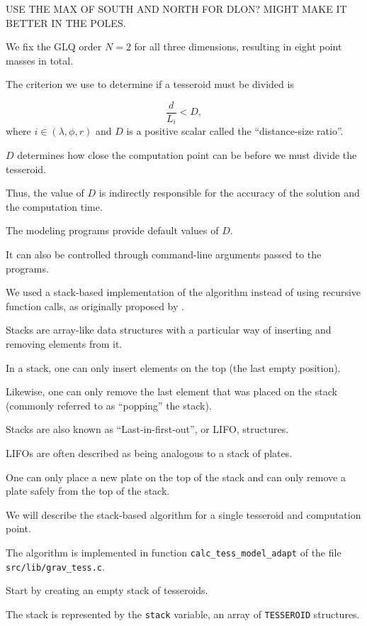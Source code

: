 \documentclass[manuscript]{geophysics}
\begin{document}
USE THE MAX OF SOUTH AND NORTH FOR DLON? MIGHT MAKE IT BETTER IN THE POLES.

We fix the GLQ order $N=2$ for all three dimensions, resulting in eight point
masses in total.

The criterion we use to determine if a tesseroid must be divided is

\begin{equation}
    \frac{d}{L_i} < D,
    \label{eq:condition}
\end{equation}
\noindent
where $i \in (\lambda, \phi, r)$
and $D$ is a positive scalar called the ``distance-size ratio''.

$D$ determines how close the
computation point can be before we must divide the tesseroid.

Thus, the value of $D$ is indirectly responsible for
the accuracy of the solution and the computation time.

The modeling programs provide default values of $D$.

It can also be controlled through command-line arguments passed to the
programs.



We used a stack-based implementation of the algorithm instead of using
recursive function calls, as originally proposed by \citet{Li2011}.

Stacks are array-like data structures with a particular way of inserting and
removing elements from it.

In a stack, one can only insert elements on the top (the last empty position).

Likewise,
one can only remove the last element that was placed on the stack
(commonly referred to as ``popping'' the stack).

Stacks are also known as ``Last-in-first-out'', or LIFO, structures.

LIFOs are often described as being analogous to a stack of plates.

One can only place a new plate on the top of the stack and
can only remove a plate safely from the top of the stack.


We will describe the stack-based algorithm for a single tesseroid and
computation point.

The algorithm is implemented in function \texttt{calc\_tess\_model\_adapt}
of the file \texttt{src/lib/grav\_tess.c}.


Start by creating an empty stack of tesseroids.

The  stack is represented by the \texttt{stack} variable,
an array of \texttt{TESSEROID} structures.
\end{document}
